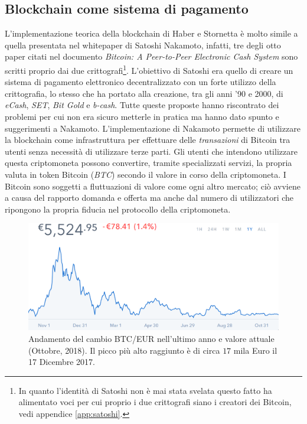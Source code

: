 \subsection{Blockchain come sistema di pagamento}
L'implementazione teorica della blockchain di Haber e Stornetta è molto simile a quella presentata nel whitepaper di Satoshi Nakamoto\cite{bitcoin}, infatti, tre degli otto paper citati nel documento \textit{Bitcoin: A Peer-to-Peer Electronic Cash System} sono scritti proprio dai due crittografi\footnote{In quanto l'identità di Satoshi non è mai stata svelata questo fatto ha alimentato voci per cui proprio i due crittografi siano i creatori dei Bitcoin, vedi appendice \ref{app:satoshi}.}.\newline
L'obiettivo di Satoshi era quello di creare un sistema di pagamento elettronico decentralizzato con un forte utilizzo della crittografia, lo stesso che ha portato alla creazione, tra gli anni '90 e 2000, di \textit{eCash}, \textit{SET}, \textit{Bit Gold} e \textit{b-cash}. Tutte queste proposte hanno riscontrato dei problemi per cui non era sicuro metterle in pratica ma hanno dato spunto e suggerimenti a Nakamoto.
L'implementazione di Nakamoto permette di utilizzare la blockchain come infrastruttura per effettuare delle \textit{transazioni} di Bitcoin tra utenti senza necessità di utilizzare terze parti. Gli utenti che intendono utilizzare questa criptomoneta possono convertire, tramite specializzati servizi, la propria valuta in token Bitcoin (\textit{BTC}) secondo il valore in corso della criptomoneta.\newline
I Bitcoin sono soggetti a fluttuazioni di valore come ogni altro mercato; ciò avviene a causa del rapporto domanda e offerta ma anche dal numero di utilizzatori che ripongono la propria fiducia nel protocollo della criptomoneta.
\begin{figure}
    \centering
    \includegraphics[width=\textwidth]{images/bitcoinchart.png}
    \caption{Andamento del cambio BTC/EUR nell'ultimo anno e valore attuale (Ottobre, 2018). Il picco più alto raggiunto è di circa $17$ mila Euro il 17 Dicembre 2017.}
\end{figure}

